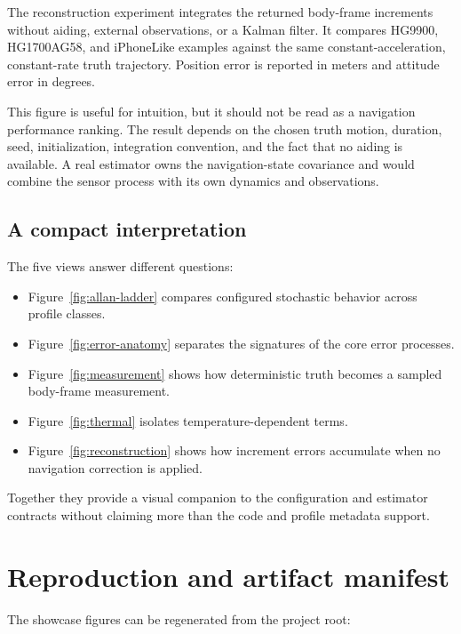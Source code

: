 \documentclass[11pt,oneside,headings=big]{scrreprt}
\begin{document}
    The reconstruction experiment integrates the returned body-frame increments
    without aiding, external observations, or a Kalman filter. It compares HG9900,
    HG1700AG58, and iPhoneLike examples against the same constant-acceleration,
    constant-rate truth trajectory. Position error is reported in meters and
    attitude error in degrees.

    This figure is useful for intuition, but it should not be read as a navigation
    performance ranking. The result depends on the chosen truth motion, duration,
    seed, initialization, integration convention, and the fact that no aiding is
    available. A real estimator owns the navigation-state covariance and would
    combine the sensor process with its own dynamics and observations.


    \section{A compact interpretation}

    The five views answer different questions:

    \begin{itemize}
        \item Figure~\ref{fig:allan-ladder} compares configured stochastic behavior
        across profile classes.
        \item Figure~\ref{fig:error-anatomy} separates the signatures of the core
        error processes.
        \item Figure~\ref{fig:measurement} shows how deterministic truth becomes a
        sampled body-frame measurement.
        \item Figure~\ref{fig:thermal} isolates temperature-dependent terms.
        \item Figure~\ref{fig:reconstruction} shows how increment errors accumulate
        when no navigation correction is applied.
    \end{itemize}

    Together they provide a visual companion to the configuration and estimator
    contracts without claiming more than the code and profile metadata support.


    \chapter{Reproduction and artifact manifest}

    The showcase figures can be regenerated from the project root:
\end{document}
